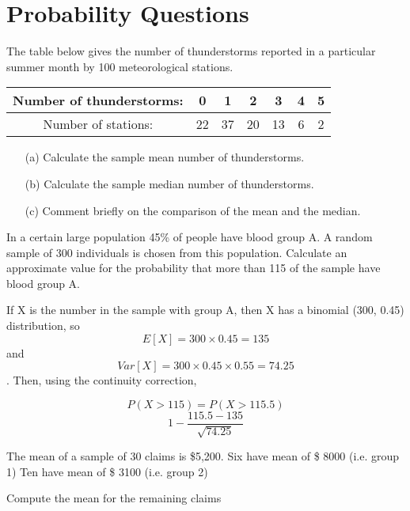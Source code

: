 \documentclass[]{report}
\begin{document}


\section{Probability Questions}









The table below gives the number of thunderstorms reported in a particular summer
month by 100 meteorological stations.

\begin{tabular}{|c|c|c|c|c|c|c|}
	Number of thunderstorms: &0& 1 &2 &3 &4 &5 \\ \hline
	Number of stations: & 22 & 37 & 20 & 13 & 6 & 2 \\ \hline
\end{tabular}

\begin{itemize}
	\item[(a)] Calculate the sample mean number of thunderstorms.
	\item[(b)] Calculate the sample median number of thunderstorms.
	\item[(c)] Comment briefly on the comparison of the mean and the median.
\end{itemize}
In a certain large population 45\% of people have blood group A. 
A random sample of 300 individuals is chosen from this population.
Calculate an approximate value for the probability that more than 115 of the sample
have blood group A.

If X is the number in the sample with group A, then X has a binomial (300, 0.45)
distribution, so
\[ E[X] = 300 \times 0.45 = 135 \] and 
\[ Var[X] = 300 \times 0.45 \times 0.55 = 74.25 \].
Then, using the continuity correction,

\[ P(X > 115) = P(X > 115.5)\]
\[ 1- \frac{115.5 - 135}{\sqrt{74.25} } \]

The mean of a sample of 30 claims is \$5,200.
Six have mean of \$ 8000 (i.e. group 1)
Ten have mean of \$ 3100 (i.e. group 2)

Compute the mean for the remaining claims
\end{document}
